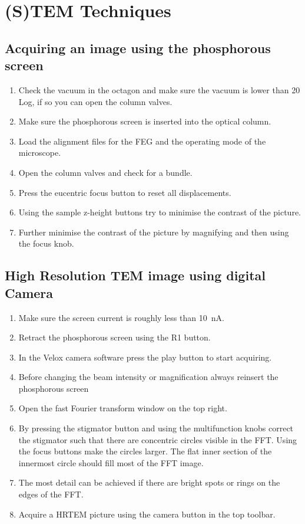 \documentclass[a4paper]{scrartcl}
\begin{document}
\section{(S)TEM  Techniques}
\subsection*{Acquiring an image using the phosphorous screen}
\begin{enumerate}
    \item Check the vacuum in the octagon and make sure the vacuum is lower than 20 Log, if so you can open the column valves.
    \item Make sure the phosphorous screen is inserted into the optical column.
    \item Load the alignment files for the FEG and the operating mode of the microscope.
    \item Open the column valves and check for a bundle.
    \item Press the eucentric focus button to reset all displacements.
    \item Using the sample z-height buttons try to minimise the contrast of the picture.
    \item Further minimise the contrast of the picture by magnifying and then using the focus knob.
\end{enumerate}

\subsection*{High Resolution TEM image using digital Camera}
\begin{enumerate}
    \item Make sure the screen current is roughly less than \SI{10}{\nano \ampere}.
    \item Retract the phosphorous screen using the R1 button.
    \item In the Velox camera software press the play button to start acquiring.
    \item Before changing the beam intensity or magnification always reinsert the phosphorous screen
    \item Open the fast Fourier transform window on the top right.
    \item By pressing the stigmator button and using the multifunction knobs correct the stigmator such that there are concentric circles visible in the FFT. Using the focus buttons make the circles larger. The flat inner section of the innermost circle should fill most of the FFT image. 
    \item The most detail can be achieved if there are bright spots or rings on the edges of the FFT.
    \item Acquire a HRTEM picture using the camera button in the top toolbar.
\end{enumerate}
\end{document}

